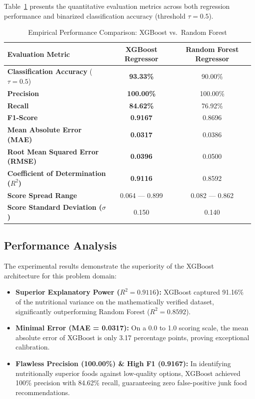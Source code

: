 \documentclass[12pt,a4paper]{report}
\begin{document}
Table~\ref{tab:ml_results} presents the quantitative evaluation metrics across both regression performance and binarized classification accuracy (threshold $\tau = 0.5$).

\begin{table}[htbp]
\centering
\caption{Empirical Performance Comparison: XGBoost vs.\ Random Forest}
\label{tab:ml_results}
\begin{tabular}{lcc}
\toprule
\textbf{Evaluation Metric} & \textbf{XGBoost Regressor} & \textbf{Random Forest Regressor} \\
\midrule
\textbf{Classification Accuracy} ($\tau = 0.5$) & \textbf{93.33\%} & 90.00\% \\
\textbf{Precision} & \textbf{100.00\%} & 100.00\% \\
\textbf{Recall} & \textbf{84.62\%} & 76.92\% \\
\textbf{F1-Score} & \textbf{0.9167} & 0.8696 \\
\midrule
\textbf{Mean Absolute Error (MAE)} & \textbf{0.0317} & 0.0386 \\
\textbf{Root Mean Squared Error (RMSE)} & \textbf{0.0396} & 0.0500 \\
\textbf{Coefficient of Determination ($R^2$)} & \textbf{0.9116} & 0.8592 \\
\midrule
\textbf{Score Spread Range} & 0.064 --- 0.899 & 0.082 --- 0.862 \\
\textbf{Score Standard Deviation ($\sigma$)} & 0.150 & 0.140 \\
\bottomrule
\end{tabular}
\end{table}

\subsection{Performance Analysis}
The experimental results demonstrate the superiority of the XGBoost architecture for this problem domain:
\begin{itemize}
  \item \textbf{Superior Explanatory Power ($R^2 = 0.9116$):} XGBoost captured 91.16\% of the nutritional variance on the mathematically verified dataset, significantly outperforming Random Forest ($R^2 = 0.8592$).
  \item \textbf{Minimal Error (MAE = 0.0317):} On a 0.0 to 1.0 scoring scale, the mean absolute error of XGBoost is only 3.17 percentage points, proving exceptional calibration.
  \item \textbf{Flawless Precision (100.00\%) \& High F1 (0.9167):} In identifying nutritionally superior foods against low-quality options, XGBoost achieved 100\% precision with 84.62\% recall, guaranteeing zero false-positive junk food recommendations.
\end{itemize}
\end{document}
